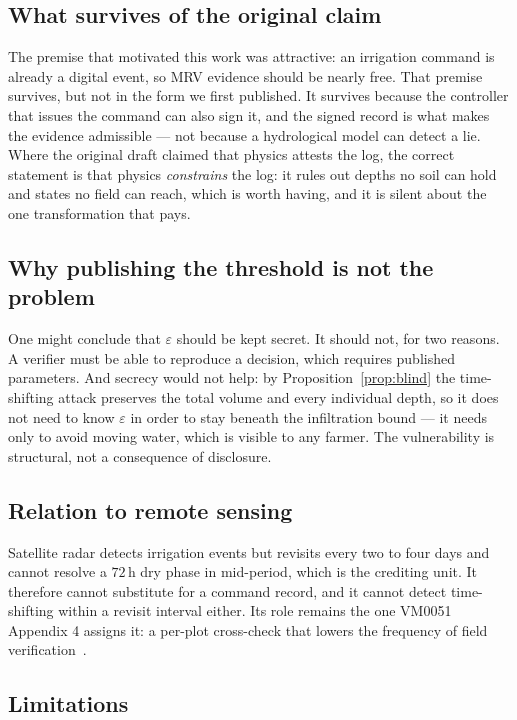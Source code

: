 \documentclass[journal]{IEEEtran}
\begin{document}
\subsection{What survives of the original claim}

The premise that motivated this work was attractive: an irrigation command is
already a digital event, so MRV evidence should be nearly free. That premise
survives, but not in the form we first published. It survives because the
controller that issues the command can also sign it, and the signed record is
what makes the evidence admissible --- not because a hydrological model can
detect a lie. Where the original draft claimed that physics attests the log, the
correct statement is that physics \emph{constrains} the log: it rules out depths
no soil can hold and states no field can reach, which is worth having, and it is
silent about the one transformation that pays.

\subsection{Why publishing the threshold is not the problem}

One might conclude that $\varepsilon$ should be kept secret. It should not, for
two reasons. A verifier must be able to reproduce a decision, which requires
published parameters. And secrecy would not help: by Proposition~\ref{prop:blind}
the time-shifting attack preserves the total volume and every individual depth,
so it does not need to know $\varepsilon$ in order to stay beneath the
infiltration bound --- it needs only to avoid moving water, which is visible to
any farmer. The vulnerability is structural, not a consequence of disclosure.

\subsection{Relation to remote sensing}

Satellite radar detects irrigation events but revisits every two to four days and
cannot resolve a $72$\,h dry phase in mid-period, which is the crediting unit.
It therefore cannot substitute for a command record, and it cannot detect
time-shifting within a revisit interval either. Its role remains the one VM0051
Appendix 4 assigns it: a per-plot cross-check that lowers the frequency of field
verification~\cite{vm0051}.

\subsection{Limitations}
\end{document}
